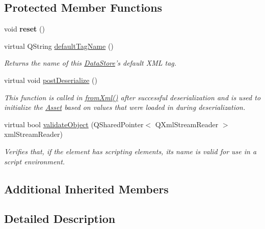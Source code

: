 \subsection*{Protected Member Functions}
\begin{DoxyCompactItemize}
\item 
\hypertarget{class_picto_1_1_file_output_a6b11b56deeb548c1a11cfd7ec4129ac4}{void {\bfseries reset} ()}\label{class_picto_1_1_file_output_a6b11b56deeb548c1a11cfd7ec4129ac4}

\item 
virtual Q\-String \hyperlink{class_picto_1_1_file_output_a6eb7e5ea56b00eb9f04fac1d606fb177}{default\-Tag\-Name} ()
\begin{DoxyCompactList}\small\item\em Returns the name of this \hyperlink{class_picto_1_1_data_store}{Data\-Store}'s default X\-M\-L tag. \end{DoxyCompactList}\item 
virtual void \hyperlink{class_picto_1_1_file_output_a1bcc204b235bc36066ef69595e390602}{post\-Deserialize} ()
\begin{DoxyCompactList}\small\item\em This function is called in \hyperlink{class_picto_1_1_asset_a8bed4da09ecb1c07ce0dab313a9aba67}{from\-Xml()} after successful deserialization and is used to initialize the \hyperlink{class_picto_1_1_asset}{Asset} based on values that were loaded in during deserialization. \end{DoxyCompactList}\item 
\hypertarget{class_picto_1_1_file_output_a50396165a477df3c1b39ebd3b0be0e0c}{virtual bool \hyperlink{class_picto_1_1_file_output_a50396165a477df3c1b39ebd3b0be0e0c}{validate\-Object} (Q\-Shared\-Pointer$<$ Q\-Xml\-Stream\-Reader $>$ xml\-Stream\-Reader)}\label{class_picto_1_1_file_output_a50396165a477df3c1b39ebd3b0be0e0c}

\begin{DoxyCompactList}\small\item\em Verifies that, if the element has scripting elements, its name is valid for use in a script environment. \end{DoxyCompactList}\end{DoxyCompactItemize}
\subsection*{Additional Inherited Members}


\subsection{Detailed Description}


